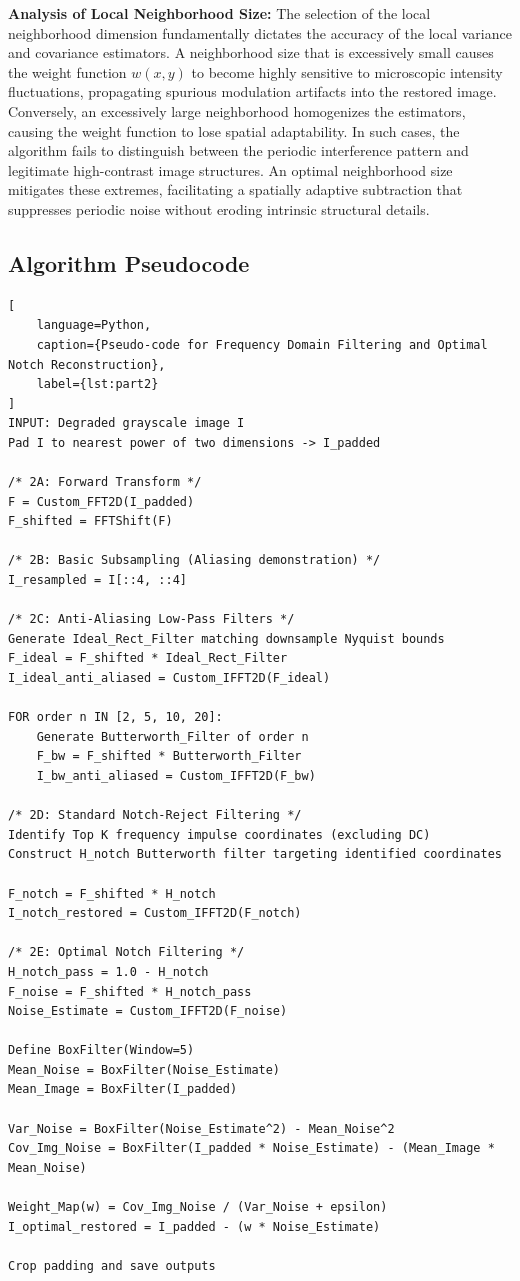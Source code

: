 \documentclass[11pt,a4paper]{article}
\begin{document}
\textbf{Analysis of Local Neighborhood Size:}
The selection of the local neighborhood dimension fundamentally dictates the accuracy of the local variance and covariance estimators. A neighborhood size that is excessively small causes the weight function $w(x,y)$ to become highly sensitive to microscopic intensity fluctuations, propagating spurious modulation artifacts into the restored image. Conversely, an excessively large neighborhood homogenizes the estimators, causing the weight function to lose spatial adaptability. In such cases, the algorithm fails to distinguish between the periodic interference pattern and legitimate high-contrast image structures. An optimal neighborhood size mitigates these extremes, facilitating a spatially adaptive subtraction that suppresses periodic noise without eroding intrinsic structural details.

\subsection{Algorithm Pseudocode}
\begin{lstlisting}[
    language=Python,
    caption={Pseudo-code for Frequency Domain Filtering and Optimal Notch Reconstruction},
    label={lst:part2}
]
INPUT: Degraded grayscale image I
Pad I to nearest power of two dimensions -> I_padded

/* 2A: Forward Transform */
F = Custom_FFT2D(I_padded)
F_shifted = FFTShift(F)

/* 2B: Basic Subsampling (Aliasing demonstration) */
I_resampled = I[::4, ::4]

/* 2C: Anti-Aliasing Low-Pass Filters */
Generate Ideal_Rect_Filter matching downsample Nyquist bounds
F_ideal = F_shifted * Ideal_Rect_Filter
I_ideal_anti_aliased = Custom_IFFT2D(F_ideal)

FOR order n IN [2, 5, 10, 20]:
    Generate Butterworth_Filter of order n
    F_bw = F_shifted * Butterworth_Filter
    I_bw_anti_aliased = Custom_IFFT2D(F_bw)

/* 2D: Standard Notch-Reject Filtering */
Identify Top K frequency impulse coordinates (excluding DC)
Construct H_notch Butterworth filter targeting identified coordinates

F_notch = F_shifted * H_notch
I_notch_restored = Custom_IFFT2D(F_notch)

/* 2E: Optimal Notch Filtering */
H_notch_pass = 1.0 - H_notch
F_noise = F_shifted * H_notch_pass
Noise_Estimate = Custom_IFFT2D(F_noise)

Define BoxFilter(Window=5)
Mean_Noise = BoxFilter(Noise_Estimate)
Mean_Image = BoxFilter(I_padded)

Var_Noise = BoxFilter(Noise_Estimate^2) - Mean_Noise^2
Cov_Img_Noise = BoxFilter(I_padded * Noise_Estimate) - (Mean_Image * Mean_Noise)

Weight_Map(w) = Cov_Img_Noise / (Var_Noise + epsilon)
I_optimal_restored = I_padded - (w * Noise_Estimate)

Crop padding and save outputs
\end{lstlisting}
\end{document}
